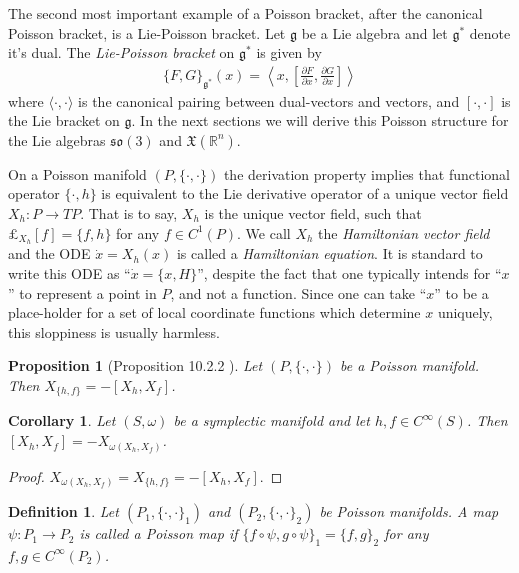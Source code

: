 \documentclass[12pt]{amsart}
\newcommand{\pder}[2]{\ensuremath{\frac{\partial #1}{\partial #2}}}
\newcommand{\so}{\ensuremath{\mathfrak{so}}}
\newtheorem{prop}[thm]{Proposition}
\newtheorem{cor}[thm]{Corollary}
\newtheorem{defn}[thm]{Definition}
\begin{document}
The second most important example of a Poisson bracket,
after the canonical Poisson bracket,
is a Lie-Poisson bracket.  Let $\mathfrak{g}$ be a Lie algebra
and let $\mathfrak{g}^*$ denote it's dual.
The \emph{Lie-Poisson bracket} on $\mathfrak{g}^*$ is given 
by
\begin{align}
  \{ F , G \}_{\mathfrak{g}^*}( x ) = 
  \left \langle x , \left[ \pder{F}{x} , \pder{G}{x} \right] \right \rangle
  \label{eq:Lie-Poisson}
\end{align}
where $\langle \cdot , \cdot \rangle$ is the canonical pairing between
dual-vectors and vectors, and $[ \cdot , \cdot ]$ is the Lie bracket
on $\mathfrak{g}$.
In the next sections we will derive this Poisson structure for the 
Lie algebras $\so(3)$ and $\mathfrak{X}(\mathbb{R}^n)$.


On a Poisson manifold $(P,\{ \cdot , \cdot \})$
the derivation property implies that functional operator
$\{ \cdot , h \}$ is equivalent
to the Lie derivative operator of a unique vector field $X_h:P \to TP$.
That is to say, $X_h$ is the unique vector field, such that $\pounds_{X_h}[f] = \{ f , h \}$ for any $f \in C^1(P)$.
We call $X_h$ the \emph{Hamiltonian vector field} and the ODE $\dot{x} = X_h(x)$ is called a \emph{Hamiltonian equation}.
It is standard to write this ODE as ``$\dot{x} = \{ x , H\}$'',
despite the fact that one typically intends for ``$x$'' to represent
a point in $P$, and not a function.
Since one can take ``$x$'' to be a place-holder for a set of
local coordinate functions which determine $x$ uniquely, this
sloppiness is usually harmless.

\begin{prop}[Proposition 10.2.2 \cite{MandS}] \label{prop:Lie_hom}
  Let $(P,\{ \cdot , \cdot \})$ be a Poisson manifold.
  Then $X_{ \{ h ,f \} } = - [X_h , X_f ]$.
\end{prop}

\begin{cor} \label{cor:Lie_hom}
  Let $(S,\omega)$ be a symplectic manifold
  and let $h,f \in C^{\infty}(S)$.
  Then $[X_h , X_f] = -X_{\omega(X_h,X_f) }$.
\end{cor}
\begin{proof}
  $X_{\omega(X_h,X_f)} = X_{ \{h,f\} } = -[X_h , X_f]$.
\end{proof}

\begin{defn}
  Let $(P_1, \{ \cdot , \cdot \}_1)$ and $(P_2, \{ \cdot , \cdot \}_2)$
  be Poisson manifolds.
  A map $\psi:P_1 \to P_2$ is called a
  \emph{Poisson map} if $\{ f \circ \psi , g \circ \psi \}_1 = \{ f , g \}_2$  for any $f,g \in C^{\infty}(P_2)$.
\end{defn}
\end{document}
